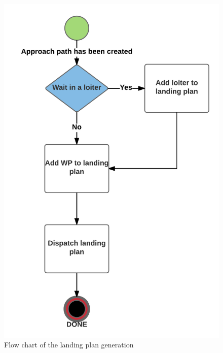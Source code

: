 \begin{figure}[H]
\centering
\includegraphics[scale=0.8]{figs/LandingPath.png}
\caption{Flow chart of the landing plan generation}
\label{Fig:FlowChartLanding}
\end{figure}

